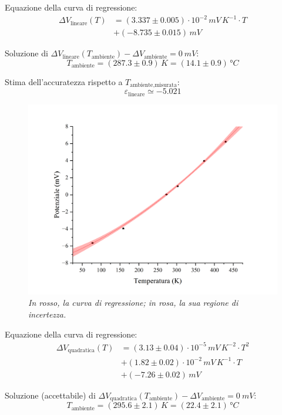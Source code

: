 \documentclass{article}
\begin{document}
Equazione della curva di regressione:
\[\begin{aligned}\Delta V_\text{lineare}(T)
  &= (3.337\pm0.005)\cdot10^{-2}\,\unit{mV\,K^{-1}}\cdot T \\
  &+ (-8.735\pm0.015)\,\unit{mV}
\end{aligned}\]

Soluzione di $
  \Delta V_\text{lineare}(T_\text{ambiente}) -
  \Delta V_\text{ambiente} = \qty{0}{mV}$:
\[T_\text{ambiente}
  = (287.3\pm0.9)\,\unit{K}
  = (14.1\pm0.9)\,\unit{\degree C}
\]

Stima dell'accuratezza rispetto a $T_\text{ambiente,misurata}$:
\[ \varepsilon_\text{lineare} \simeq -5.021 \]

\pagebreak
\begin{figure}[H]
  \centering
  \includegraphics[trim={2cm 0.6cm 3cm 1cm},clip,width=\textwidth]{img/regressione2.png}
  \caption*{\emph{
    In rosso, la curva di regressione; in rosa, la sua regione di incertezza.
  }}
\end{figure}

Equazione della curva di regressione:
\[\begin{aligned}\Delta V_\text{quadratica}(T)
  &= (3.13\pm0.04)\cdot10^{-5}\,\unit{mV\,K^{-2}}\cdot T^2 \\
  &+ (1.82\pm0.02)\cdot10^{-2}\,\unit{mV\,K^{-1}}\cdot T \\
  &+ (-7.26\pm0.02)\,\unit{mV}
\end{aligned}\]

Soluzione (accettabile) di $
  \Delta V_\text{quadratica}(T_\text{ambiente}) -
  \Delta V_\text{ambiente} = \qty{0}{mV}$:
\[T_\text{ambiente}
  = (295.6\pm2.1)\,\unit{K}
  = (22.4\pm2.1)\,\unit{\degree C}
\]
\end{document}
